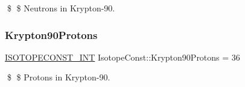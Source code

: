 \$ \$ Neutrons in Krypton-\/90. \mbox{\label{group___isotope_const-_krypton-_kr90_ga4ad7a4dee295bdf16668b4cb9782c7ed}} 
\subsubsection{\texorpdfstring{Krypton90\+Protons}{Krypton90Protons}}
{\footnotesize\ttfamily \mbox{\hyperlink{group___isotope_const-_macros_ga5f18360b3e99483a35c32d789e62621c}{I\+S\+O\+T\+O\+P\+E\+C\+O\+N\+S\+T\+\_\+\+I\+NT}} Isotope\+Const\+::\+Krypton90\+Protons = 36}

\$ \$ Protons in Krypton-\/90. 